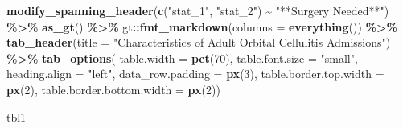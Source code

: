 \documentclass[
]{article}
\newenvironment{Shaded}{\begin{snugshade}}{\end{snugshade}}
\newcommand{\AttributeTok}[1]{\textcolor[rgb]{0.13,0.29,0.53}{#1}}
\newcommand{\DecValTok}[1]{\textcolor[rgb]{0.00,0.00,0.81}{#1}}
\newcommand{\FunctionTok}[1]{\textcolor[rgb]{0.13,0.29,0.53}{\textbf{#1}}}
\newcommand{\NormalTok}[1]{#1}
\newcommand{\SpecialCharTok}[1]{\textcolor[rgb]{0.81,0.36,0.00}{\textbf{#1}}}
\newcommand{\StringTok}[1]{\textcolor[rgb]{0.31,0.60,0.02}{#1}}
\begin{document}
\begin{Shaded}
\begin{Highlighting}[]
  \FunctionTok{modify\_spanning\_header}\NormalTok{(}\FunctionTok{c}\NormalTok{(}\StringTok{"stat\_1"}\NormalTok{, }\StringTok{"stat\_2"}\NormalTok{) }\SpecialCharTok{\textasciitilde{}} \StringTok{"**Surgery Needed**"}\NormalTok{) }\SpecialCharTok{\%\textgreater{}\%}
  \FunctionTok{as\_gt}\NormalTok{() }\SpecialCharTok{\%\textgreater{}\%}
\NormalTok{  gt}\SpecialCharTok{::}\FunctionTok{fmt\_markdown}\NormalTok{(}\AttributeTok{columns =} \FunctionTok{everything}\NormalTok{()) }\SpecialCharTok{\%\textgreater{}\%}
  \FunctionTok{tab\_header}\NormalTok{(}\AttributeTok{title =} \StringTok{"Characteristics of Adult Orbital Cellulitis Admissions"}\NormalTok{) }\SpecialCharTok{\%\textgreater{}\%}
  \FunctionTok{tab\_options}\NormalTok{(}
    \AttributeTok{table.width =} \FunctionTok{pct}\NormalTok{(}\DecValTok{70}\NormalTok{),}
    \AttributeTok{table.font.size =} \StringTok{"small"}\NormalTok{,}
    \AttributeTok{heading.align =} \StringTok{"left"}\NormalTok{,}
    \AttributeTok{data\_row.padding =} \FunctionTok{px}\NormalTok{(}\DecValTok{3}\NormalTok{),}
    \AttributeTok{table.border.top.width =} \FunctionTok{px}\NormalTok{(}\DecValTok{2}\NormalTok{),}
    \AttributeTok{table.border.bottom.width =} \FunctionTok{px}\NormalTok{(}\DecValTok{2}\NormalTok{))}

\NormalTok{tbl1}
\end{Highlighting}
\end{Shaded}
\end{document}
